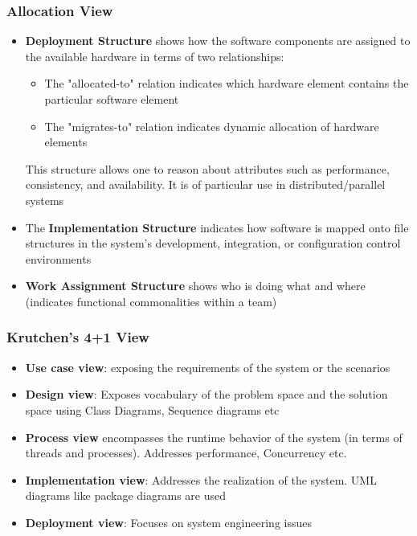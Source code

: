 \documentclass{article}
\begin{document}
\subsubsection{Allocation View}
\begin{itemize}
    \item \textbf{Deployment Structure} shows how the software components are assigned to the available hardware in terms of two relationships:
    \begin{itemize}
        \item The "allocated-to" relation indicates which hardware element contains the particular software element
        
        \item The "migrates-to" relation indicates dynamic allocation of hardware elements
    \end{itemize}
    This structure allows one to reason about attributes such as performance, consistency, and availability. It is of particular use in distributed/parallel systems
    
    \item The \textbf{Implementation Structure} indicates how software is mapped onto file structures in the system's development, integration, or configuration control environments

    \item \textbf{Work Assignment Structure} shows who is doing what and where (indicates functional commonalities within a team)
\end{itemize}

\subsubsection{Krutchen's 4+1 View}
\begin{itemize}
    \item \textbf{Use case view}: exposing the requirements of the system or the scenarios
   
    \item\textbf{ Design view}: Exposes vocabulary of the problem space and the solution space using Class Diagrams, Sequence diagrams etc

    \item \textbf{Process view} encompasses the runtime behavior of the system (in terms of threads and processes). Addresses performance, Concurrency etc.

    \item \textbf{Implementation view}: Addresses the realization of the system. UML diagrams like package diagrams are used

    \item \textbf{Deployment view}: Focuses on system engineering issues
\end{itemize}
\end{document}
